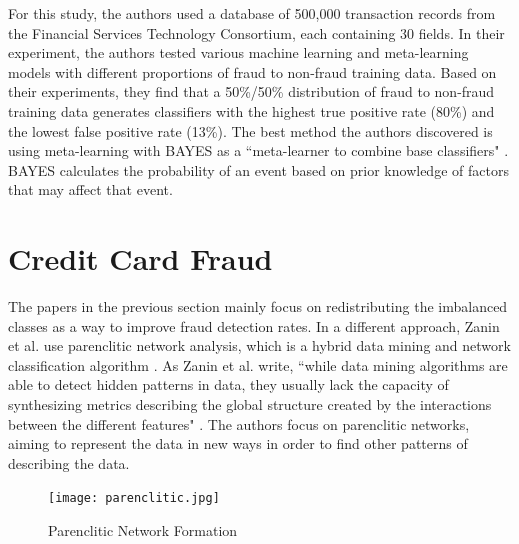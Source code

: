 \documentclass[midd]{thesis}
\begin{document}

For this study, the authors used a database of 500,000 transaction records from the Financial Services Technology Consortium, each containing 30 fields. In their experiment, the authors tested various machine learning and meta-learning models with different proportions of fraud to non-fraud training data. Based on their experiments, they find that a 50\%/50\% distribution of fraud to non-fraud training data generates classifiers with the highest true positive rate (80\%) and the lowest false positive rate (13\%). The best method the authors discovered is using meta-learning with BAYES as a ``meta-learner to combine base classifiers" \cite{Stolfo1997}. BAYES calculates the probability of an event based on prior knowledge of factors that may affect that event.


\section{Credit Card Fraud}

The papers in the previous section mainly focus on redistributing the imbalanced classes as a way to improve fraud detection rates. In a different approach, Zanin et al. use parenclitic network analysis, which is a hybrid data mining and network classification algorithm \cite{Zanin2018}. As Zanin et al. write, ``while data mining algorithms are able to detect hidden patterns in data, they usually lack the capacity of synthesizing metrics describing the global structure created by the interactions between the different features" \cite{Zanin2018}. The authors focus on parenclitic networks, aiming to represent the data in new ways in order to find other patterns of describing the data. 

\begin{figure}
\centering
  \texttt{[image: parenclitic.jpg]}
  \caption{Parenclitic Network Formation \cite{Boccaletti}}
  \label{fig:parenclitic}
\end{figure}
\end{document}
